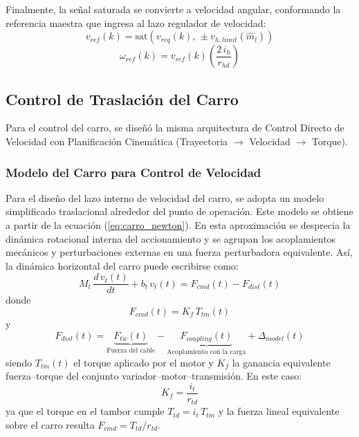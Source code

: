 \documentclass[11pt]{article}                                    %
\begin{document}
Finalmente, la señal saturada se convierte a velocidad angular, conformando la referencia maestra que ingresa al lazo regulador de velocidad:
\begin{equation}
    v_{ref}(k) = \text{sat}\left( v_{req}(k), \, \pm v_{h,limit}(\hat{m}_l) \right)
\end{equation}
\begin{equation}
    \omega_{ref}(k) = v_{ref}(k) \left( \frac{2 \, i_h}{r_{hd}} \right)
\end{equation}

\subsection{Control de Traslación del Carro}
Para el control del carro, se diseñó la misma arquitectura de Control Directo de Velocidad con Planificación Cinemática (Trayectoria $\to$ Velocidad $\to$ Torque).

\subsubsection{Modelo del Carro para Control de Velocidad}
Para el diseño del lazo interno de velocidad del carro, se adopta un modelo simplificado traslacional alrededor del punto de operación. Este modelo se obtiene a partir de la ecuación (\ref{eq:carro_newton}). En esta aproximación se desprecia la dinámica rotacional interna del accionamiento y se agrupan los acoplamientos mecánicos y perturbaciones externas en una fuerza perturbadora equivalente. Así, la dinámica horizontal del carro puede escribirse como:
\begin{equation}
    M_t\,\frac{d \, v_t(t)}{dt} + b_t\,v_t(t) = F_{cmd}(t) - F_{dist}(t)
\end{equation}
donde
\begin{equation}
    F_{cmd}(t)=K_f\,T_{tm}(t)
\end{equation}
y
\begin{equation}
    F_{dist}(t) = \underbrace{F_{tw}(t)}_{\text{Fuerza del cable}}
    - \underbrace{F_{coupling}(t)}_{\text{Acoplamiento con la carga}}
    + \Delta_{model}(t)
\end{equation}
siendo $T_{tm}(t)$ el torque aplicado por el motor y $K_f$ la ganancia equivalente fuerza--torque del conjunto variador--motor--transmisión. En este caso:
\begin{equation}
    K_f = \frac{i_t}{r_{td}}
\end{equation}
ya que el torque en el tambor cumple $T_{td}=i_t\,T_{tm}$ y la fuerza lineal equivalente sobre el carro resulta $F_{cmd}=T_{td}/r_{td}$.
\end{document}
